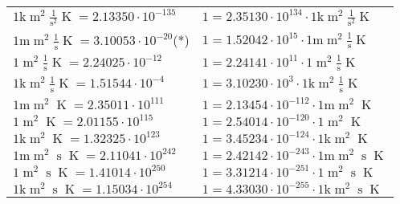 \begin{center}
\begin{longtable}{l l}
{\color{gray}$1 \bm{\mathrm{ k}}{\operatorname{m}^2}\frac1{\operatorname{s}^2}{}{\operatorname{K}} = 2.13350\cdot10^{-135} $}   & {\color{gray}$ 1 = 2.35130\cdot10^{134} \cdot 1 \bm{\mathrm{ k}}{\operatorname{m}^2}\frac1{\operatorname{s}^2}{}{\operatorname{K}}$}  \\
{\color{gray}$1 \bm{\mathrm{ m}}{\operatorname{m}^2}\frac1{\operatorname{s}}{}{\operatorname{K}} = 3.10053\cdot10^{-20} $}\quad(*) & {\color{gray}$ 1 = 1.52042\cdot10^{15} \cdot 1 \bm{\mathrm{ m}}{\operatorname{m}^2}\frac1{\operatorname{s}}{}{\operatorname{K}}$}  \\
{\color{black}$1 \bm{\mathrm{ }}{\operatorname{m}^2}\frac1{\operatorname{s}}{}{\operatorname{K}} = 2.24025\cdot10^{-12} $}   & {\color{black}$ 1 = 2.24141\cdot10^{11} \cdot 1 \bm{\mathrm{ }}{\operatorname{m}^2}\frac1{\operatorname{s}}{}{\operatorname{K}}$}  \\
{\color{gray}$1 \bm{\mathrm{ k}}{\operatorname{m}^2}\frac1{\operatorname{s}}{}{\operatorname{K}} = 1.51544\cdot10^{-4} $}   & {\color{gray}$ 1 = 3.10230\cdot10^{3} \cdot 1 \bm{\mathrm{ k}}{\operatorname{m}^2}\frac1{\operatorname{s}}{}{\operatorname{K}}$}  \\
{\color{gray}$1 \bm{\mathrm{ m}}{\operatorname{m}^2}{}{}{\operatorname{K}} = 2.35011\cdot10^{111} $}   & {\color{gray}$ 1 = 2.13454\cdot10^{-112} \cdot 1 \bm{\mathrm{ m}}{\operatorname{m}^2}{}{}{\operatorname{K}}$}  \\
{\color{black}$1 \bm{\mathrm{ }}{\operatorname{m}^2}{}{}{\operatorname{K}} = 2.01155\cdot10^{115} $}   & {\color{black}$ 1 = 2.54014\cdot10^{-120} \cdot 1 \bm{\mathrm{ }}{\operatorname{m}^2}{}{}{\operatorname{K}}$}  \\
{\color{gray}$1 \bm{\mathrm{ k}}{\operatorname{m}^2}{}{}{\operatorname{K}} = 1.32325\cdot10^{123} $}   & {\color{gray}$ 1 = 3.45234\cdot10^{-124} \cdot 1 \bm{\mathrm{ k}}{\operatorname{m}^2}{}{}{\operatorname{K}}$}  \\
{\color{gray}$1 \bm{\mathrm{ m}}{\operatorname{m}^2}{\operatorname{s}}{}{\operatorname{K}} = 2.11041\cdot10^{242} $}   & {\color{gray}$ 1 = 2.42142\cdot10^{-243} \cdot 1 \bm{\mathrm{ m}}{\operatorname{m}^2}{\operatorname{s}}{}{\operatorname{K}}$}  \\
{\color{black}$1 \bm{\mathrm{ }}{\operatorname{m}^2}{\operatorname{s}}{}{\operatorname{K}} = 1.41014\cdot10^{250} $}   & {\color{black}$ 1 = 3.31214\cdot10^{-251} \cdot 1 \bm{\mathrm{ }}{\operatorname{m}^2}{\operatorname{s}}{}{\operatorname{K}}$}  \\
{\color{gray}$1 \bm{\mathrm{ k}}{\operatorname{m}^2}{\operatorname{s}}{}{\operatorname{K}} = 1.15034\cdot10^{254} $}   & {\color{gray}$ 1 = 4.33030\cdot10^{-255} \cdot 1 \bm{\mathrm{ k}}{\operatorname{m}^2}{\operatorname{s}}{}{\operatorname{K}}$}  \\

\end{longtable}
\end{center}
